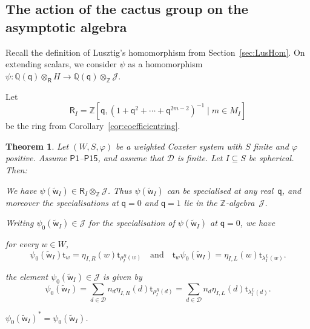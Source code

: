 \documentclass[11pt]{article}
\theoremstyle{plain}
\newtheorem{thm}{Theorem}[section]
\theoremstyle{definition}
\numberwithin{equation}{section}
\def\tw{\widetilde{\mathsf{w}}_I}
\def\cD{\mathcal{D}}
\def\cJ{\mathcal{J}}
\newcommand{\la}{\lambda}
\def\QQ{\mathbb{Q}}
\def\ZZ{\mathbb{Z}}
\def\la{\lambda}
\def\la{\lambda}
\def\sR{\mathsf{R}}
\newcommand{\st}{\mathsf{t}}
\newcommand{\sq}{\mathsf{q}}
\begin{document}
\subsection{The action of the cactus group on the asymptotic algebra}\label{sec:mainproof}


Recall the definition of Lusztig's homomorphism from Section~\ref{sec:LusHom}. On extending scalars, we consider $\psi$ as a homomorphism $\psi:\QQ(\sq)\otimes_{\sR} H\to \QQ(\sq)\otimes_{\ZZ}\cJ$. 

Let 
$$
\sR_I=\ZZ[\sq,(1+\sq^2+\cdots+\sq^{2m-2})^{-1}\mid m\in M_I]
$$
be the ring from Corollary~\ref{cor:coefficientring}. 

\begin{thm}\label{thm:mainresult}
Let $(W,S,\varphi)$ be a weighted Coxeter system with $S$ finite and $\varphi$ positive. Assume $\mathsf{P1}$--$\mathsf{P15}$, and assume that $\cD$ is finite. Let $I\subseteq S$ be spherical. Then:
\begin{compactenum}[$(1)$]
\item We have $\psi(\tw)\in\sR_I\otimes_{\ZZ}\cJ$. Thus $\psi(\tw)$ can be specialised at any real~$\sq$, and moreover the specialisations at $\sq=0$ and $\sq=1$ lie in the $\ZZ$-algebra~$\cJ$. 
\item Writing $\psi_0(\tw)\in\cJ$ for the specialisation of $\psi(\tw)$ at $\sq=0$, we have
\begin{compactenum}[$(a)$]
\item for every $w\in W$, 
$$
\psi_0(\tw)\st_w=\eta_{I,R}(w)\st_{\rho_I^R(w)}\quad\text{and}\quad \st_w\psi_0(\tw)=\eta_{I,L}(w)\st_{\la_I^L(w)}.
$$ 
\item the element $\psi_0(\tw)\in\cJ$ is given by
$$
\psi_0(\tw)=\sum_{d\in\cD}n_d\eta_{I,R}(d)\st_{\rho_I^R(d)}=\sum_{d\in\cD}n_d\eta_{I,L}(d)\st_{\la_I^L(d)}. 
$$
\item $\psi_0(\tw)^*=\psi_0(\tw)$. 
\end{compactenum}
\end{compactenum}
\end{thm}
\end{document}
